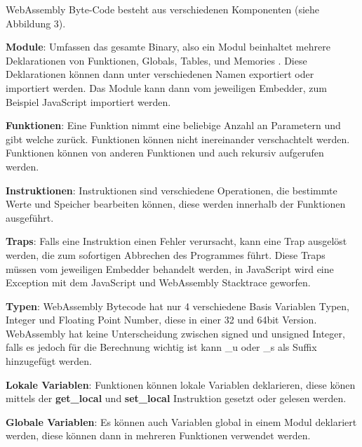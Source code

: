 WebAssembly Byte-Code besteht aus verschiedenen Komponenten (siehe Abbildung 3).


\begin{flushleft}
\textbf{Module}: Umfassen das gesamte Binary, also ein Modul beinhaltet mehrere Deklarationen von Funktionen, Globals, Tables, und Memories \autocite[]{Haas2017}. Diese Deklarationen können dann unter verschiedenen Namen exportiert oder importiert werden. Das Module kann dann vom jeweiligen Embedder, zum Beispiel JavaScript importiert werden. \autocite[]{Haas2017}

\hfill \break

\textbf{Funktionen}: Eine Funktion nimmt eine beliebige Anzahl an Parametern und gibt welche zurück. Funktionen können nicht inereinander verschachtelt werden. Funktionen können von anderen Funktionen und auch rekursiv aufgerufen werden. \autocite[]{Haas2017}

\hfill \break

\textbf{Instruktionen}: Instruktionen sind verschiedene Operationen, die bestimmte Werte und Speicher bearbeiten können, diese werden innerhalb der Funktionen ausgeführt. \autocite[]{Haas2017}

\hfill \break

\textbf{Traps}: Falls eine Instruktion einen Fehler verursacht, kann eine Trap ausgelöst werden, die zum sofortigen Abbrechen des Programmes führt. Diese Traps müssen vom jeweiligen Embedder behandelt werden, in JavaScript wird eine Exception mit dem JavaScript und WebAssembly Stacktrace geworfen. \autocite[]{Haas2017}

\hfill \break

\textbf{Typen}: WebAssembly Bytecode hat nur 4 verschiedene Basis Variablen Typen, Integer und Floating Point Number, diese in einer 32 und 64bit Version. WebAssembly hat keine Unterscheidung zwischen signed und unsigned Integer, falls es jedoch für die Berechnung wichtig ist kann \_u oder \_s als Suffix hinzugefügt werden. \autocite[]{Haas2017}

\hfill \break

\textbf{Lokale Variablen}: Funktionen können lokale Variablen deklarieren, diese könen mittels der \textbf{get\_local} und \textbf{set\_local} Instruktion gesetzt oder gelesen werden. \autocite[]{Haas2017}

\hfill \break

\textbf{Globale Variablen}: Es können auch Variablen global in einem Modul deklariert werden, diese können dann in mehreren Funktionen verwendet werden. \autocite[]{Haas2017}


\end{flushleft}
